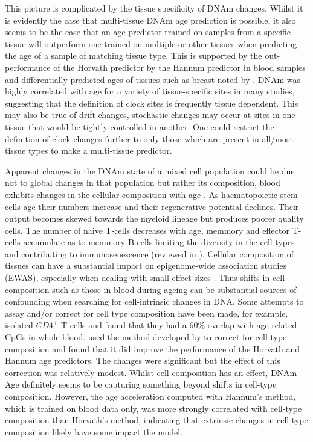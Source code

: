 \documentclass[]{book}
\begin{document}
This picture is complicated by the tissue specificity of DNAm changes. Whilst it is evidently the case that multi-tissue DNAm age prediction is possible, it also seems to be the case that an age predictor trained on samples from a specific tissue will outperform one trained on multiple or other tissues when predicting the age of a sample of matching tissue type. This is supported by the out-performance of the Horvath predictor by the Hannum predictor in blood samples \citep{Marioni2015} and differentially predicted ages of tissues such as breast noted by \citet{Horvath2013}. DNAm was highly correlated with age for a variety of tissue-specific sites in many studies, suggesting that the definition of clock sites is frequently tissue dependent. This may also be true of drift changes, stochastic changes may occur at sites in one tissue that would be tightly controlled in another. One could restrict the definition of clock changes further to only those which are present in all/most tissue types to make a multi-tissue predictor.

Apparent changes in the DNAm state of a mixed cell population could be due not to global changes in that population but rather its composition, blood exhibits changes in the cellular composition with age \citep{Rimmele2014}. As haematopoietic stem cells age their numbers increase and their regenerative potential declines. Their output becomes skewed towards the myeloid lineage but produces poorer quality cells. The number of naive T-cells decreases with age, memmory and effector T-cells accumulate as to memmory B cells limiting the diversity in the cell-types and contributing to immunosenescence (reviewed in \citep{Geiger2013}). Cellular composition of tissues can have a substantial impact on epigenome-wide association studies (EWAS), especially when dealing with small effect sizes \citep{Jaffe2014}. Thus shifts in cell composition such as those in blood during ageing can be substantial sources of confounding when searching for cell-intrinsic changes in DNA. Some attempts to assay and/or correct for cell type composition have been made, for example, \citet{Rakyan2010} isolated \(CD4^+\) T-cells and found that they had a 60\% overlap with age-related CpGs in whole blood. \citet{Chen2016a} used the method developed by \citet{Houseman2012} to correct for cell-type composition and found that it did improve the performance of the Horvath and Hannum age predictors. The changes were significant but the effect of this correction was relatively modest. Whilst cell composition has an effect, DNAm Age definitely seems to be capturing something beyond shifts in cell-type composition. However, the age acceleration computed with Hannum's method, which is trained on blood data only, was more strongly correlated with cell-type composition than Horvath's method, indicating that extrinsic changes in cell-type composition likely have some impact the model.
\end{document}
